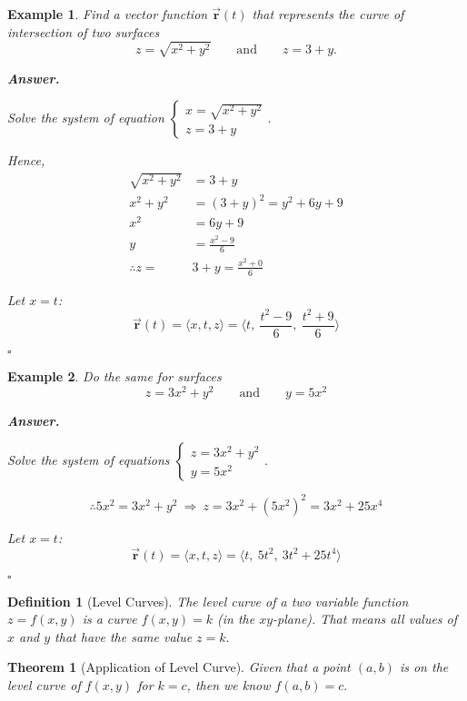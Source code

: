 \documentclass[12pt,a4paper]{article}
\newtheorem{thm}{Theorem}[subsection]
\newtheorem{df}{Definition}[subsection]
\newtheorem{eg}{Example}[subsection]
\newenvironment*{ans}{\par\indent\textbf{\textit{Answer. }}\par}{\par\hfill{$\square$}\par}
\def\vecr{\vec{\boldsymbol{\textbf{r}}}}
\begin{document}
\begin{eg}
	Find a vector function $\vecr(t)$ that represents the curve of intersection of two surfaces\[z=\sqrt{x^2+y^2}\qquad\text{and}\qquad z=3+y.\]
	\begin{ans}
		Solve the system of equation $\begin{cases}x=\sqrt{x^2+y^2}\\z=3+y\end{cases}.$\par
		Hence, \[\begin{aligned}
			\sqrt{x^2+y^2}&=3+y\\
			x^2+y^2&=(3+y)^2=y^2+6y+9\\
			x^2&=6y+9\\
			y&=\frac{x^2-9}{6}\\
			\therefore z=&3+y=\frac{x^2+0}{6}
 		\end{aligned}\]\par 
 		Let $x=t$: \[\vecr(t)=\langle x,t,z\rangle=\Big\langle t,\ \frac{t^2-9}{6},\ \frac{t^2+9}{6}\Big\rangle\]
	\end{ans}
\end{eg}
\begin{eg}
	Do the same for surfaces\[z=3x^2+y^2\qquad\text{and}\qquad y=5x^2\]
	\begin{ans}
		Solve the system of equations $\begin{cases}z=3x^2+y^2\\y=5x^2\end{cases}.$\par
		\[\therefore 5x^2=3x^2+y^2\ \Longrightarrow\ z=3x^2+(5x^2)^2=3x^2+25x^4\]\par 
		Let $x=t$: \[\vecr(t)=\langle x,t,z\rangle=\Big\langle t,\ 5t^2,\ 3t^2+25t^4\Big\rangle\]	
	\end{ans}
\end{eg}
\begin{df}[Level Curves]
	The level curve of a two variable function $z=f(x,y)$ is a curve $f(x,y)=k$ (in the $xy$-plane). That means all values of $x$ and $y$ that have the same value $z=k.$
\end{df}
\begin{thm}[Application of Level Curve]
	Given that a point $(a,b)$ is on the level curve of $f(x,y)$ for $k=c$, then we know $f(a,b)=c.$	
\end{thm}
\end{document}
